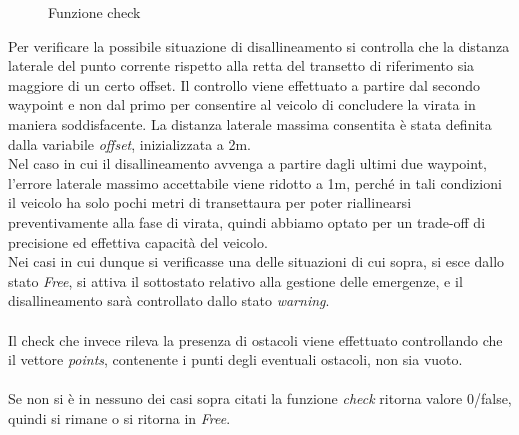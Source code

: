 \documentclass{article}
\begin{document}
            
            \begin{figure} [ht]
                \caption{Funzione check}
                \label{fig:check}
            \end{figure}

            Per verificare la possibile situazione di disallineamento si controlla che la distanza laterale del punto corrente
            rispetto alla retta del transetto di riferimento sia maggiore di un certo offset. Il controllo viene effettuato a partire dal secondo waypoint e non dal primo
            per consentire al veicolo di concludere la virata in maniera soddisfacente. La distanza laterale massima consentita è stata definita dalla variabile
            \emph{offset}, inizializzata a 2m.\\
            Nel caso in cui il disallineamento avvenga a partire dagli ultimi due waypoint,
            l'errore laterale massimo accettabile viene ridotto a 1m, perché in tali condizioni il veicolo ha solo pochi metri di transettaura per poter riallinearsi
            preventivamente alla fase di virata, quindi abbiamo optato per un trade-off di precisione ed effettiva capacità del veicolo.\\
            Nei casi in cui
            dunque si verificasse una delle situazioni di cui sopra, si esce dallo stato \emph{Free}, si attiva il sottostato relativo alla gestione delle emergenze,
            e il disallineamento sarà controllato dallo stato \emph{warning}.\\
            \\

            Il check che invece rileva la presenza di ostacoli viene effettuato controllando che il vettore \emph{points}, contenente i punti degli eventuali 
            ostacoli, non sia vuoto.
            \\
            \\Se non si è in nessuno dei casi sopra citati la funzione \emph{check} ritorna valore 0/false, quindi si
            rimane o si ritorna in \emph{Free}.\\
\end{document}
